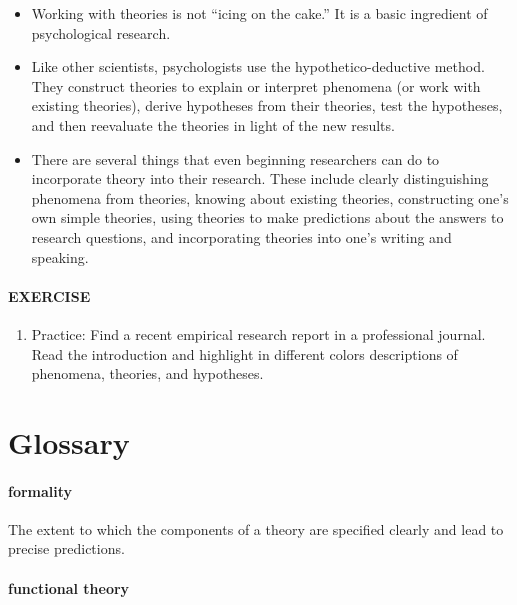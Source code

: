 \documentclass[
]{krantz}
\providecommand{\tightlist}{%
  \setlength{\itemsep}{0pt}\setlength{\parskip}{0pt}}
\begin{document}
\begin{itemize}
\tightlist
\item
  Working with theories is not ``icing on the cake.'' It is a basic ingredient of psychological research.
\item
  Like other scientists, psychologists use the hypothetico-deductive method. They construct theories to explain or interpret phenomena (or work with existing theories), derive hypotheses from their theories, test the hypotheses, and then reevaluate the theories in light of the new results.
\item
  There are several things that even beginning researchers can do to incorporate theory into their research. These include clearly distinguishing phenomena from theories, knowing about existing theories, constructing one's own simple theories, using theories to make predictions about the answers to research questions, and incorporating theories into one's writing and speaking.
\end{itemize}

\paragraph*{EXERCISE}\label{exercise-5}

\begin{enumerate}
\def\labelenumi{\arabic{enumi}.}
\tightlist
\item
  Practice: Find a recent empirical research report in a professional journal. Read the introduction and highlight in different colors descriptions of phenomena, theories, and hypotheses.
\end{enumerate}

\section{Glossary}\label{glossary-10}

\paragraph*{formality}\label{formality-1}

The extent to which the components of a theory are specified clearly and lead to precise predictions.

\paragraph*{functional theory}\label{functional-theory}
\end{document}

